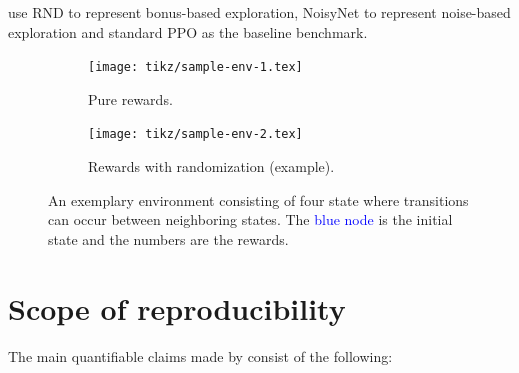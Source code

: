 \documentclass[10pt]{article} %
\begin{document}
\noindent \cite{rle-paper} use RND to represent bonus-based exploration, NoisyNet to represent noise-based exploration and standard PPO as the baseline benchmark.

\begin{figure}[h!]
  \centering
  \begin{subfigure}[b]{0.45\textwidth}
    \centering
    \texttt{[image: tikz/sample-env-1.tex]}
    \caption{Pure rewards.}
    \label{fig:sample-env-1}
  \end{subfigure}
  \hfill
  \begin{subfigure}[b]{0.45\textwidth}
    \centering
    \texttt{[image: tikz/sample-env-2.tex]}
    \caption{Rewards with randomization (example).}
    \label{fig:sample-env-2}
  \end{subfigure}
  
  \caption{An exemplary environment consisting of four state where transitions can occur between neighboring states. The \textcolor{blue}{blue node} is the initial state and the numbers are the rewards.}
  \label{fig:sample-env}
\end{figure}

\newpage
\section{Scope of reproducibility}
\label{sec:claims}

\noindent The main quantifiable claims made by \cite{rle-paper} consist of the following:
\end{document}
